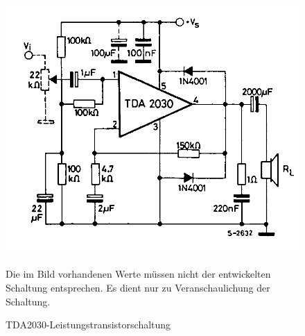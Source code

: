 \begin{figure} [H]
	\centering
	\includegraphics[width=1\textwidth]{img/Grundlagen/TDA2030/TDA2030-Grundschaltung.png}
	\caption{TDA2030-Leistungstransistorschaltung}
	\text Die im Bild vorhandenen Werte müssen nicht der entwickelten Schaltung entsprechen. Es dient nur zu Veranschaulichung der Schaltung.
	\label {fig:3.2.2.1}
\end{figure}


